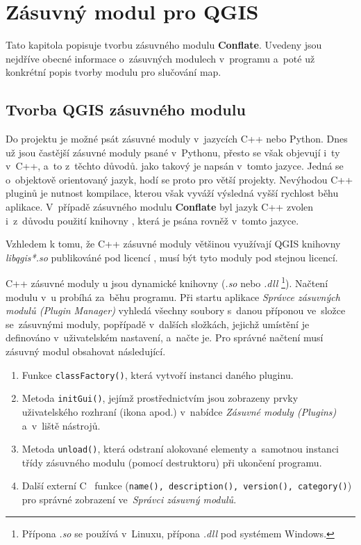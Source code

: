 \chapter{Zásuvný modul pro QGIS}
\label{6-plugin}

Tato kapitola popisuje tvorbu zásuvného modulu \textbf{Conflate}.
Uvedeny jsou nejdříve obecné informace o~zásuvných modulech v~programu
 a~poté už kon\-krétní popis tvorby modulu pro 
slučování map. 

\section{Tvorba QGIS zásuvného modulu}
\label{plugin-tvorba}

Do projektu  je možné psát zásuvné moduly v~jazycích C++ 
nebo Python. Dnes už jsou častější zásuvné moduly psané v~Pythonu, přesto 
se však objevují i~ty v~C++, a~to z~těchto důvodů.  jako takový 
je napsán v~tomto jazyce. Jedná se o~objektově orientovaný jazyk, hodí se 
proto pro větší projekty. Nevýhodou C++ pluginů je nutnost kompilace, kterou 
však vyváží výsledná vyšší rychlost běhu aplikace. V~případě zásuvného modulu 
\textbf{Conflate} byl jazyk C++ zvolen i~z~důvodu použití knihovny , 
která je psána rovněž v~tomto jazyce.

Vzhledem k tomu, že C++ zásuvné moduly většinou využívají QGIS knihovny
\textit{libqgis*.so} publikováné pod licencí , musí být 
tyto moduly pod stejnou licencí.

C++ zásuvné moduly u jsou dynamické knihovny (\textit{.so} nebo 
\textit{.dll} \footnote{ Přípona \textit{.so} se používá v~Linuxu, přípona 
\textit{.dll} pod systémem Windows.}). Načtení modulu v~u probíhá 
za~běhu programu. Při startu aplikace \textit{Správce zásuvných modulů 
(Plugin Manager)} vyhledá všechny soubory s~danou příponou ve~složce 
se~zásuvnými moduly, popřípadě v~dalších složkách, jejichž umístění
je definováno v~uživatelském nastavení, a~načte je. Pro správné načtení musí 
zásuvný modul obsahovat následující.

\begin{enumerate}
 \item Funkce \texttt{classFactory()}, která vytvoří instanci daného pluginu.
 \item Metoda \texttt{initGui()}, jejímž prostřednictvím jsou zobrazeny prvky 
	uživatelského rozhraní (ikona apod.) v~nabídce \textit{Zásuvné moduly 
	(Plugins)} a~v~liště nástrojů.
 \item Metoda \texttt{unload()}, která odstraní alokované elementy a~samotnou
	instanci třídy zásuvného modulu (pomocí destruktoru) při ukončení 
	programu.
 \item Další externí C ~funkce (\texttt{na\-me(), descrip\-tion(), version(),
	category()}) pro správné zobrazení ve~\textit{Správci zásuvný modulů}.
\end{enumerate}

